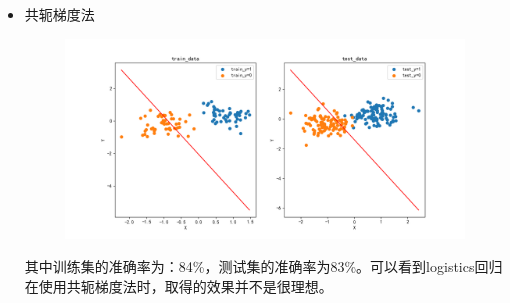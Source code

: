 \documentclass[lang=cn,a4paper,cite=authoryear]{elegantpaper}
\begin{document}
\begin{itemize}
\par
\item 共轭梯度法
\begin{center}
	\begin{figure}[H]
		\centering
		\includegraphics[scale=0.5]{gctest01}
	\end{figure}
\end{center}
其中训练集的准确率为：84\%，测试集的准确率为83\%。可以看到logistics回归在使用共轭梯度法时，取得的效果并不是很理想。
\end{itemize}
\end{document}
